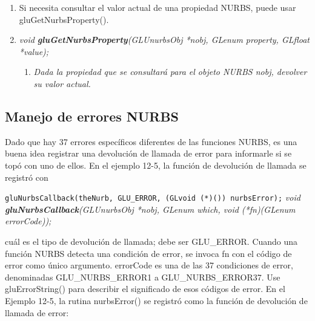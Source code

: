 \begin{enumerate}
{    const GLint viewport[4]);}
        \begin{enumerate}
            \item[] \textit{Si GLU\_AUTO\_LOAD\_MATRIX está desactivado,
                las matrices de proyección y vista de modelo y la
                ventana gráfica especificada en gluLoadSamplingMatrices()
                se utilizan para calcular las matrices de muestreo y
                selección para cada curva o superficie NURBS.
            }
        \end{enumerate}
    \item[] Si necesita consultar el valor actual de una propiedad NURBS,
    puede usar gluGetNurbsProperty().
    \item[] \emph{void \textbf{gluGetNurbsProperty}(GLUnurbsObj *nobj,
    GLenum property, GLfloat *value);}
        \begin{enumerate}
            \item[] \textit{Dada la propiedad que se consultará
                para el objeto NURBS nobj, devolver su valor actual.
            }
        \end{enumerate}
\end{enumerate}

\subsection{Manejo de errores NURBS}

Dado que hay 37 errores específicos diferentes de las funciones NURBS,
es una buena idea registrar una devolución de llamada de error para
informarle si se topó con uno de ellos.
En el ejemplo 12-5, la función de devolución de llamada se registró con


\texttt{gluNurbsCallback(theNurb, GLU\_ERROR, (GLvoid (*)()) nurbsError);}
\linebreak
\emph{void \textbf{gluNurbsCallback}(GLUnurbsObj *nobj, GLenum which,
void (*fn)(GLenum errorCode));}

cuál es el tipo de devolución de llamada; debe ser GLU\_ERROR. Cuando una función NURBS detecta una condición de error, se invoca fn con el código de error como único argumento. errorCode es una de las 37 condiciones de error, denominadas GLU\_NURBS\_ERROR1 a GLU\_NURBS\_ERROR37. Use gluErrorString() para describir el significado de esos códigos de error.
\linebreak
En el Ejemplo 12-5, la rutina nurbsError() se registró como la función de devolución de llamada de error:


